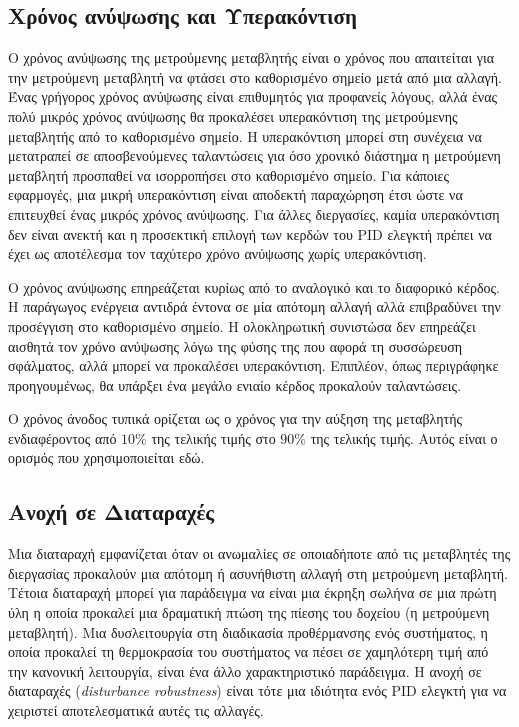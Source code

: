 \subsection{Χρόνος ανύψωσης και Υπερακόντιση} \label{subsce:rise_time}

Ο χρόνος ανύψωσης της μετρούμενης μεταβλητής είναι ο χρόνος που απαιτείται για την μετρούμενη μεταβλητή να φτάσει στο καθορισμένο σημείο μετά από μια αλλαγή. Ένας γρήγορος χρόνος ανύψωσης είναι επιθυμητός για προφανείς λόγους, αλλά ένας πολύ μικρός χρόνος ανύψωσης θα προκαλέσει υπερακόντιση της μετρούμενης μεταβλητής από το καθορισμένο σημείο. Η υπερακόντιση μπορεί στη συνέχεια να μετατραπεί σε αποσβενούμενες ταλαντώσεις για όσο χρονικό διάστημα η μετρούμενη μεταβλητή προσπαθεί να ισορροπήσει στο καθορισμένο σημείο. Για κάποιες εφαρμογές, μια μικρή υπερακόντιση είναι αποδεκτή παραχώρηση έτσι ώστε να επιτευχθεί ένας μικρός χρόνος ανύψωσης. Για άλλες διεργασίες, καμία υπερακόντιση δεν είναι ανεκτή και η προσεκτική επιλογή των κερδών του PID ελεγκτή πρέπει να έχει ως αποτέλεσμα τον ταχύτερο χρόνο ανύψωσης χωρίς υπερακόντιση. 

Ο χρόνος ανύψωσης επηρεάζεται κυρίως από το αναλογικό και το διαφορικό κέρδος. Η παράγωγος ενέργεια αντιδρά έντονα σε μία απότομη αλλαγή αλλά επιβραδύνει την προσέγγιση στο καθορισμένο σημείο. Η ολοκληρωτική συνιστώσα δεν επηρεάζει αισθητά τον χρόνο ανύψωσης λόγω της φύσης της που αφορά τη συσσώρευση σφάλματος, αλλά μπορεί να προκαλέσει υπερακόντιση. Επιπλέον, όπως περιγράφηκε προηγουμένως, θα υπάρξει ένα μεγάλο ενιαίο κέρδος προκαλούν ταλαντώσεις. 

Ο χρόνος άνοδος τυπικά ορίζεται ως ο χρόνος για την αύξηση της μεταβλητής ενδιαφέροντος από $10\%$ της τελικής τιμής στο $90\%$ της τελικής τιμής. Αυτός είναι ο ορισμός που χρησιμοποιείται εδώ.

\subsection{Ανοχή σε Διαταραχές}

Μια διαταραχή εμφανίζεται όταν οι ανωμαλίες σε οποιαδήποτε από τις μεταβλητές της διεργασίας προκαλούν μια απότομη ή ασυνήθιστη αλλαγή στη μετρούμενη μεταβλητή. Τέτοια διαταραχή μπορεί για παράδειγμα να είναι μια έκρηξη σωλήνα σε μια πρώτη ύλη η οποία προκαλεί μια δραματική πτώση της πίεσης του δοχείου (η μετρούμενη μεταβλητή). Μια δυσλειτουργία στη διαδικασία προθέρμανσης ενός συστήματος, η οποία προκαλεί τη θερμοκρασία του συστήματος να πέσει σε χαμηλότερη τιμή από την κανονική λειτουργία, είναι ένα άλλο χαρακτηριστικό παράδειγμα. Η ανοχή σε διαταραχές (\emph{disturbance robustness}) είναι τότε μια ιδιότητα ενός PID ελεγκτή για να χειριστεί αποτελεσματικά αυτές τις αλλαγές.

